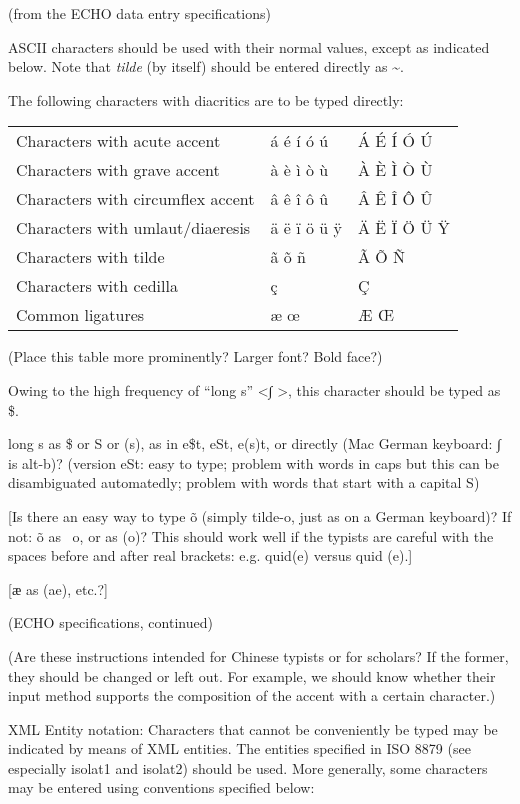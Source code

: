 (from the ECHO data entry specifications)

ASCII characters should be used with their normal values, except as indicated below. Note that \emph{tilde} (by itself) should be entered directly as \textasciitilde.

The following characters with diacritics are to be typed directly:

\begin{tabular}{lll}
Characters with acute accent & á é í ó ú & Á É Í Ó Ú \\
Characters with grave accent & à è ì ò ù & À È Ì Ò Ù \\
Characters with circumflex accent & â ê î ô û & Â Ê Î Ô Û \\
Characters with umlaut/diaeresis & ä ë ï ö ü ÿ & Ä Ë Ï Ö Ü Ÿ \\
Characters with tilde & ã õ ñ & Ã Õ Ñ \\
Characters with cedilla & ç & Ç \\
Common ligatures & æ œ & Æ Œ \\
\end{tabular}

(Place this table more prominently? Larger font? Bold face?)

Owing to the high frequency of “long s” <∫ >, this character should be typed as \$. 

long s as \$ or S or (s), as in e\$t, eSt, e(s)t, or directly (Mac German keyboard: ∫ is alt-b)? (version eSt: easy to type; problem with words in caps but this can be disambiguated automatedly; problem with words that start with a capital S)

[Is there an easy way to type õ (simply tilde-o, just as on a German keyboard)? If not: õ as ~o, or as (o)? This should work well if the typists are careful with the spaces before and after real brackets: e.g. quid(e) versus quid (e).]

[ӕ as (ae), etc.?]


(ECHO specifications, continued)

(Are these instructions intended for Chinese typists or for scholars? If the former, they should be changed or left out. For example, we should know whether their input method supports  the composition of the accent with a certain character.)

XML Entity notation: Characters that cannot be conveniently be typed may be indicated by means of XML entities. The entities specified in ISO 8879 (see especially isolat1 and isolat2) should be used. More generally, some characters may be entered using conventions specified below:

